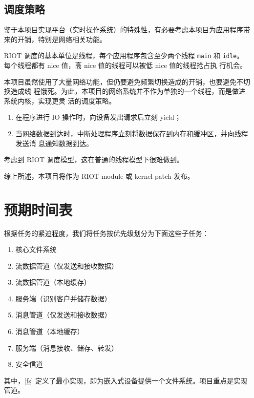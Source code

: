 \documentclass{ctexart}
\begin{document}
\subsection{调度策略}
鉴于本项目实现平台（实时操作系统）的特殊性，有必要考虑本项目为应用程序带来的开销，特别是网络相关功能。

RIOT 调度的基本单位是线程，每个应用程序包含至少两个线程 \verb|main| 和
\verb|idle|。每个线程都有 nice 值，高 nice 值的线程可以被低 nice 值的线程抢占执
行机会。

本项目虽然使用了大量网络功能，但仍要避免频繁切换造成的开销，也要避免不切换造成线
程饿死。为此，本项目的网络系统并不作为单独的一个线程，而是做进系统内核，实现更灵
活的调度策略。
\begin{enumerate}
\item 在程序进行 IO 操作时，向设备发出请求后立刻 yield；
\item 当网络数据到达时，中断处理程序立刻将数据保存到内存和缓冲区，并向线程发送消
  息通知数据到达。
\end{enumerate}
考虑到 RIOT 调度模型，这在普通的线程模型下很难做到。

综上所述，本项目将作为 RIOT module 或 kernel patch 发布。

\section{预期时间表}
根据任务的紧迫程度，我们将任务按优先级划分为下面这些子任务：

\begin{enumerate}
	\item \label{fs} 核心文件系统
	\item \label{stream-send} 流数据管道（仅发送和接收数据）
	\item \label{stream-buffer} 流数据管道（本地缓存）
	\item \label{server-stream} 服务端（识别客户并储存数据）
	\item \label{msg-send} 消息管道（仅发送和接收数据）
	\item \label{msg-buffer} 消息管道（本地缓存）
	\item \label{server-msg} 服务端（消息接收、储存、转发）
	\item \label{security} 安全信道
\end{enumerate}

其中，\ref{fs} 定义了最小实现，即为嵌入式设备提供一个文件系统。项目重点是实现管道。
\end{document}
